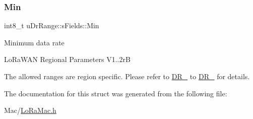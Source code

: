 \subsubsection{\texorpdfstring{Min}{Min}}
{\footnotesize\ttfamily int8\+\_\+t u\+Dr\+Range\+::s\+Fields\+::\+Min}

Minimum data rate

Lo\+Ra\+W\+AN Regional Parameters V1..\+2rB

The allowed ranges are region specific. Please refer to \hyperlink{group__REGION_ga6c4ef966b4f3d5eb7597b087f2b97095}{D\+R\+\_} to \hyperlink{group__REGION_gac6e078f51b71f05093daf27834997396}{D\+R\+\_} for details. 

The documentation for this struct was generated from the following file\+:\begin{DoxyCompactItemize}
\item 
Mac/\hyperlink{LoRaMac_8h}{Lo\+Ra\+Mac.\+h}\end{DoxyCompactItemize}
